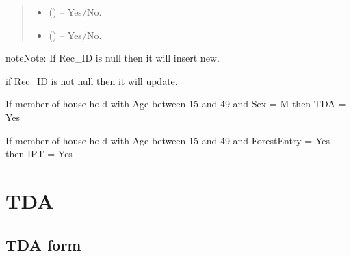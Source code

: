 \documentclass[letterpaper,10pt,english,openany,oneside]{sphinxmanual}
\begin{document}
\begin{fulllineitems}
\begin{quote}
\begin{description}
\begin{itemize}
\item {} 
\sphinxAtStartPar
{} () – Yes/No.

\item {} 
\sphinxAtStartPar
{} () – Yes/No.

\end{itemize}

\end{description}\end{quote}

\begin{sphinxadmonition}{note}{Note:}
\sphinxAtStartPar
If Rec\_ID is null then it will insert new.

\sphinxAtStartPar
if Rec\_ID is not null then it will update.

\sphinxAtStartPar
If member of house hold with Age between 15 and 49 and Sex = M then TDA = Yes

\sphinxAtStartPar
If member of house hold with Age between 15 and 49 and ForestEntry = Yes then IPT = Yes
\end{sphinxadmonition}

\end{fulllineitems}



\section{TDA}
\label{\detokenize{api-last-mile/v1:tda}}

\subsection{TDA form}
\label{\detokenize{api-last-mile/v1:tda-form}}
\end{document}
